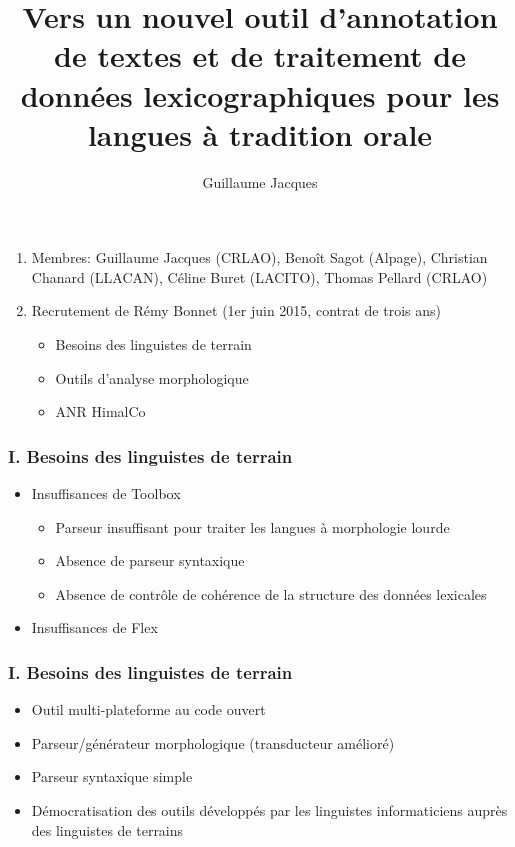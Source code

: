 \documentclass[xcolor=table]{beamer}
\begin{document}
 \title{Vers un nouvel outil d'annotation de textes et de traitement de données lexicographiques pour les langues à tradition orale}
 \author{Guillaume Jacques}
 \maketitle


 \begin{frame} 
 \frametitle{ }
 \begin{enumerate}%
 \item Membres: Guillaume Jacques (CRLAO), Benoît Sagot (Alpage), Christian Chanard (LLACAN), Céline Buret (LACITO), Thomas Pellard (CRLAO)
 \item Recrutement de Rémy Bonnet (1er juin 2015, contrat de trois ans)
  \begin{itemize}
\item Besoins des linguistes de terrain
\item Outils d'analyse morphologique
\item ANR HimalCo
 \end{itemize}
 \end{enumerate}

\end{frame}

 \begin{frame} 
 \frametitle{I. Besoins des linguistes de terrain}
 \begin{itemize}
 \item Insuffisances de Toolbox 
 \begin{itemize}
 \item Parseur insuffisant pour traiter les langues à morphologie lourde
 \item Absence de parseur syntaxique
 \item Absence de contrôle de cohérence de la structure des données lexicales
 \end{itemize}
 \item Insuffisances de Flex
  \end{itemize}
\end{frame}

 \begin{frame} 
 \frametitle{I. Besoins des linguistes de terrain}
 \begin{itemize}
 \item Outil multi-plateforme au code ouvert
 \item Parseur/générateur morphologique (transducteur amélioré)
 \item Parseur syntaxique simple
 \item Démocratisation des outils développés par les linguistes informaticiens auprès des linguistes de terrains
  \end{itemize}
\end{frame}
\end{document}
